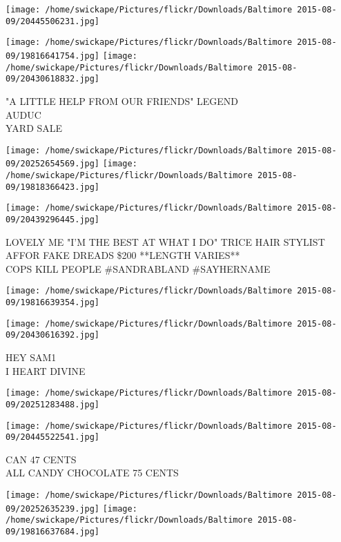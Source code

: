 \documentclass[10pt,letterpaper]{article}
\begin{document}
\texttt{[image: /home/swickape/Pictures/flickr/Downloads/Baltimore 2015-08-09/20445506231.jpg]}

\vspace{0.25in}
\texttt{[image: /home/swickape/Pictures/flickr/Downloads/Baltimore 2015-08-09/19816641754.jpg]}
\texttt{[image: /home/swickape/Pictures/flickr/Downloads/Baltimore 2015-08-09/20430618832.jpg]}

"A LITTLE HELP FROM OUR FRIENDS" LEGEND\\
AUDUC\\
YARD SALE\\
\pagebreak

\texttt{[image: /home/swickape/Pictures/flickr/Downloads/Baltimore 2015-08-09/20252654569.jpg]}
\texttt{[image: /home/swickape/Pictures/flickr/Downloads/Baltimore 2015-08-09/19818366423.jpg]}

\vspace{0.25in}
\texttt{[image: /home/swickape/Pictures/flickr/Downloads/Baltimore 2015-08-09/20439296445.jpg]}

LOVELY ME "I'M THE BEST AT WHAT I DO" TRICE HAIR STYLIST\\
AFFOR FAKE DREADS \$200 **LENGTH VARIES**\\
COPS KILL PEOPLE \#SANDRABLAND \#SAYHERNAME\\
\pagebreak

\texttt{[image: /home/swickape/Pictures/flickr/Downloads/Baltimore 2015-08-09/19816639354.jpg]}

\vspace{0.25in}
\texttt{[image: /home/swickape/Pictures/flickr/Downloads/Baltimore 2015-08-09/20430616392.jpg]}

HEY SAM1\\
I HEART DIVINE\\
\pagebreak

\texttt{[image: /home/swickape/Pictures/flickr/Downloads/Baltimore 2015-08-09/20251283488.jpg]}

\vspace{0.25in}
\texttt{[image: /home/swickape/Pictures/flickr/Downloads/Baltimore 2015-08-09/20445522541.jpg]}

CAN 47 CENTS\\
ALL CANDY CHOCOLATE 75 CENTS\\
\pagebreak

\texttt{[image: /home/swickape/Pictures/flickr/Downloads/Baltimore 2015-08-09/20252635239.jpg]}
\texttt{[image: /home/swickape/Pictures/flickr/Downloads/Baltimore 2015-08-09/19816637684.jpg]}
\end{document}
